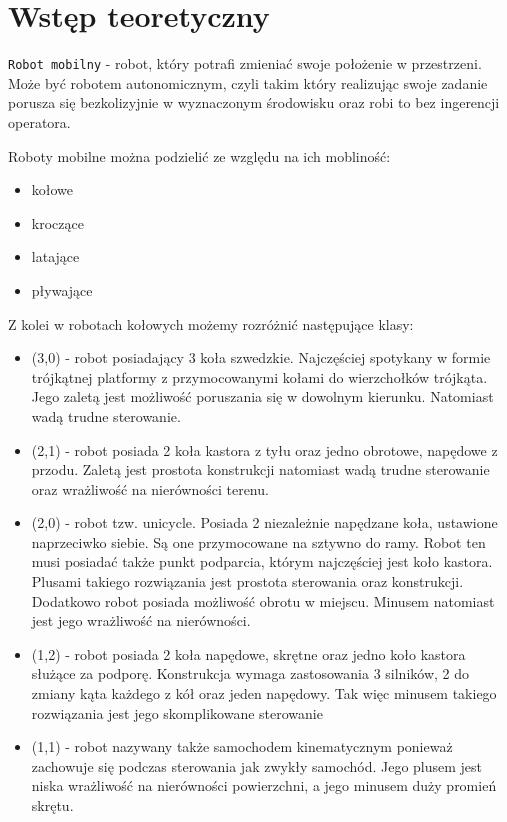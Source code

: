 

\chapter{Wstęp teoretyczny}
	\texttt{Robot mobilny} - robot, który potrafi zmieniać swoje położenie w przestrzeni. Może być robotem autonomicznym, czyli takim który realizując swoje zadanie porusza się bezkolizyjnie w wyznaczonym środowisku oraz robi to bez ingerencji operatora.
	
	Roboty mobilne można podzielić ze względu na ich mobliność:
	\begin{itemize}
		\item kołowe
		\item kroczące
		\item latające
		\item pływające
	\end{itemize}
	Z kolei w robotach kołowych możemy rozróżnić następujące klasy:
	\begin{itemize}
		\item (3,0) - robot posiadający 3 koła szwedzkie. Najczęściej spotykany w formie trójkątnej platformy z przymocowanymi kołami do wierzchołków trójkąta. Jego zaletą jest możliwość poruszania się w dowolnym kierunku. Natomiast wadą trudne sterowanie.
		\item (2,1) - robot posiada 2 koła kastora z tyłu oraz jedno obrotowe, napędowe z przodu. Zaletą jest prostota konstrukcji natomiast wadą trudne sterowanie oraz wrażliwość na nierówności terenu.
		\item (2,0) - robot tzw. unicycle. Posiada 2 niezależnie napędzane koła, ustawione naprzeciwko siebie. Są one przymocowane na sztywno do ramy. Robot ten musi posiadać także punkt podparcia, którym najczęściej jest koło kastora. Plusami takiego rozwiązania jest prostota sterowania oraz konstrukcji. Dodatkowo robot posiada możliwość obrotu w miejscu. Minusem natomiast jest jego wrażliwość na nierówności.
		\item (1,2) - robot posiada 2 koła napędowe, skrętne oraz jedno koło kastora służące za podporę. Konstrukcja wymaga zastosowania 3 silników, 2 do zmiany kąta każdego z kół oraz jeden napędowy. Tak więc minusem takiego rozwiązania jest jego skomplikowane sterowanie
		\item (1,1) - robot nazywany także samochodem kinematycznym ponieważ zachowuje się podczas sterowania jak zwykły samochód. Jego plusem jest niska wrażliwość na nierówności powierzchni, a jego minusem duży promień skrętu.
	\end{itemize}
	
